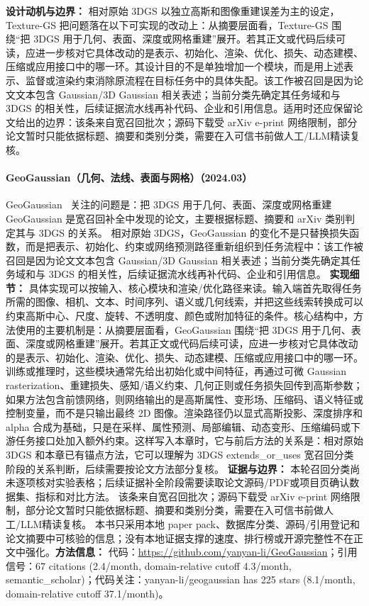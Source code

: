 \textbf{设计动机与边界：} 相对原始 3DGS 以独立高斯和图像重建误差为主的设定，Texture-GS 把问题落在以下可实现的改动上：从摘要层面看，Texture-GS 围绕“把 3DGS 用于几何、表面、深度或网格重建”展开。若其正文或代码后续可读，应进一步核对它具体改动的是表示、初始化、渲染、优化、损失、动态建模、压缩或应用接口中的哪一环。其设计目的不是单独增加一个模块，而是用上述表示、监督或渲染约束消除原流程在目标任务中的具体失配。该工作被召回是因为论文文本包含 Gaussian/3D Gaussian 相关表述；当前分类先确定其任务域和与 3DGS 的相关性，后续证据流水线再补代码、企业和引用信息。适用时还应保留论文给出的边界：该条来自宽召回批次；源码下载受 arXiv e-print 网络限制，部分论文暂时只能依据标题、摘要和类别分类，需要在入可信书前做人工/LLM精读复核。
\paragraph{GeoGaussian（几何、法线、表面与网格）（2024.03）}
GeoGaussian~\cite{2403_11324} 关注的问题是：把 3DGS 用于几何、表面、深度或网格重建 GeoGaussian 是宽召回补全中发现的论文，主要根据标题、摘要和 arXiv 类别判定其与 3DGS 的关系。
相对原始 3DGS，GeoGaussian 的变化不是只替换损失函数，而是把表示、初始化、约束或网络预测路径重新组织到任务流程中：该工作被召回是因为论文文本包含 Gaussian/3D Gaussian 相关表述；当前分类先确定其任务域和与 3DGS 的相关性，后续证据流水线再补代码、企业和引用信息。
\textbf{实现细节：} 具体实现可以按输入、核心模块和渲染/优化路径来读。输入端首先取得任务所需的图像、相机、文本、时间序列、语义或几何线索，并把这些线索转换成可以约束高斯中心、尺度、旋转、不透明度、颜色或附加特征的条件。核心结构中，方法使用的主要机制是：从摘要层面看，GeoGaussian 围绕“把 3DGS 用于几何、表面、深度或网格重建”展开。若其正文或代码后续可读，应进一步核对它具体改动的是表示、初始化、渲染、优化、损失、动态建模、压缩或应用接口中的哪一环。 训练或推理时，这些模块通常先给出初始化或中间特征，再通过可微 Gaussian rasterization、重建损失、感知/语义约束、几何正则或任务损失回传到高斯参数；如果方法包含前馈网络，则网络输出的是高斯属性、变形场、压缩码、语义特征或控制变量，而不是只输出最终 2D 图像。渲染路径仍以显式高斯投影、深度排序和 alpha 合成为基础，只是在采样、属性预测、局部编辑、动态变形、压缩编码或下游任务接口处加入额外约束。这样写入本章时，它与前后方法的关系是：相对原始 3DGS 和本章已有锚点方法，它可以理解为 3DGS extends\_or\_uses 宽召回分类阶段的关系判断，后续需要按论文方法部分复核。
\textbf{证据与边界：} 本轮召回分类尚未逐项核对实验表格；后续证据补全阶段需要读取论文源码/PDF或项目页确认数据集、指标和对比方法。 该条来自宽召回批次；源码下载受 arXiv e-print 网络限制，部分论文暂时只能依据标题、摘要和类别分类，需要在入可信书前做人工/LLM精读复核。 本书只采用本地 paper pack、数据库分类、源码/引用登记和论文摘要中可核验的信息；没有本地证据支撑的速度、排行榜或开源完整性不在正文中强化。\textbf{方法信息：} 代码：\url{https://github.com/yanyan-li/GeoGaussian}；引用信号：67 citations (2.4/month, domain-relative cutoff 4.3/month, semantic\_scholar)；代码关注：yanyan-li/geogaussian has 225 stars (8.1/month, domain-relative cutoff 37.1/month)。
